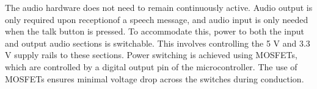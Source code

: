 The audio hardware does not need to remain continuously active.
Audio output is only required upon receptionof a speech message,
 and audio input is only needed when the talk button is pressed.
To accommodate this, power to both the input and output audio sections is switchable. 
This involves controlling the 5 V and 3.3 V supply rails to these sections.
Power switching is achieved using MOSFETs, which are controlled by a digital output pin of the microcontroller.
The use of MOSFETs ensures minimal voltage drop across the switches during conduction.
